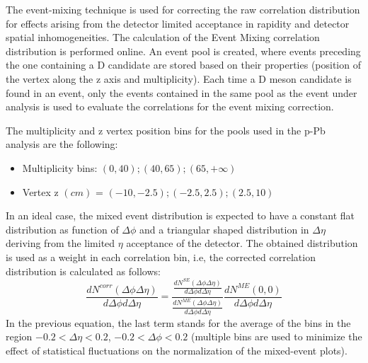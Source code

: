 The event-mixing technique is used for correcting the raw correlation distribution for effects arising
from the detector limited acceptance in rapidity and detector spatial inhomogeneities. The calculation of the Event
Mixing correlation distribution is performed online.%
An event pool is created, where events preceding the one containing a D candidate are stored based on their properties (position of the vertex along the z axis and multiplicity). 
Each time a D meson candidate is found in an event, only the events contained in the same pool as the event under analysis is used to evaluate the correlations for the event mixing correction.%

The multiplicity and z vertex position bins for the pools used in the p-Pb analysis are the following:
\begin{itemize}
\item Multiplicity bins: $\left(0,40\right);\left(40,65\right);\left(65,+\infty\right)$
\item Vertex z $(cm)$ = $\left(-10,-2.5\right);\left(-2.5,2.5\right);\left(2.5,10\right)$
\end{itemize}


In an ideal case, the mixed event distribution is expected to have a constant flat distribution as function of $\Delta\phi$ and a triangular shaped distribution in $\Delta\eta$
deriving from the limited $\eta$ acceptance of the detector. The obtained distribution is used as a weight in each correlation bin, i.e, the corrected correlation distribution is calculated as follows:
\begin{equation}
\label{eq:mixing}
\frac{dN^{corr}\left(\Delta\phi \Delta\eta\right)}{d\Delta\phi d\Delta\eta} = \frac{\frac{dN^{SE}\left(\Delta\phi \Delta\eta\right)}{d\Delta\phi d\Delta\eta} }{\frac{dN^{ME}\left(\Delta\phi \Delta\eta\right)}{d\Delta\phi d\Delta\eta} }\frac{dN^{ME}\left(0,  0\right)}{d\Delta\phi d\Delta\eta}
\end{equation}
In the previous equation, the last term stands for the average of the bins in the region $-0.2 < \Delta\eta < 0.2$, $-0.2 < \Delta\phi < 0.2$ (multiple bins are used to minimize the effect of statistical fluctuations on the normalization of the mixed-event plots).

